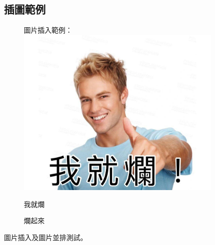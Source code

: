 \subsection{插圖範例}
\begin{figure}[h]
圖片插入範例： \\
   \centering
   \includegraphics[width=10cm]{../Figures/Result/我就爛}
   \caption{我就爛}\label{fig:我就爛}

   \caption{爛起來}\label{fig:爛起來}
\end{figure}
圖片插入及圖片並排測試。
\clearpage

